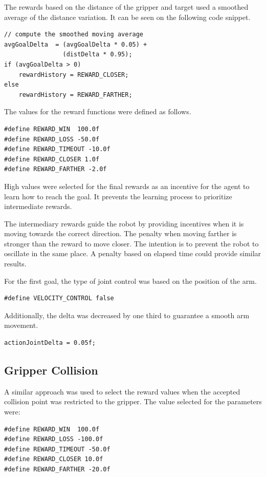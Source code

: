 \documentclass[10pt,journal,compsoc]{IEEEtran}
\begin{document}
The rewards based on the distance of the gripper and target used a smoothed average of the distance variation. It can be seen on the following code snippet.
\begin{lstlisting}
// compute the smoothed moving average
avgGoalDelta  = (avgGoalDelta * 0.05) + 
                (distDelta * 0.95);
if (avgGoalDelta > 0)
	rewardHistory = REWARD_CLOSER;
else
	rewardHistory = REWARD_FARTHER;				
\end{lstlisting}

The values for the reward functions were defined as follows. 
\begin{lstlisting}
#define REWARD_WIN  100.0f
#define REWARD_LOSS -50.0f
#define REWARD_TIMEOUT -10.0f
#define REWARD_CLOSER 1.0f
#define REWARD_FARTHER -2.0f
\end{lstlisting}

High values were selected for the final rewards as an incentive for the agent to learn how to reach the goal. It prevents the learning process to prioritize intermediate rewards.

The intermediary rewards guide the robot by providing incentives when it is moving towards the correct direction. The penalty when moving farther is stronger than the reward to move closer. The intention is to prevent the robot to oscillate in the same place. A penalty based on elapsed time could provide similar results.

For the first goal, the type of joint control was based on the position of the arm. 
\begin{lstlisting}
#define VELOCITY_CONTROL false	
\end{lstlisting}

Additionally, the delta was decreased by one third to guarantee a smooth arm movement.
\begin{lstlisting}
actionJointDelta = 0.05f;
\end{lstlisting}


\subsection{Gripper Collision}

A similar approach was used to select the reward values when the accepted collision point was restricted to the gripper. The value selected for the parameters were:
\begin{lstlisting}
#define REWARD_WIN  100.0f
#define REWARD_LOSS -100.0f
#define REWARD_TIMEOUT -50.0f
#define REWARD_CLOSER 10.0f
#define REWARD_FARTHER -20.0f
\end{lstlisting}
\end{document}
